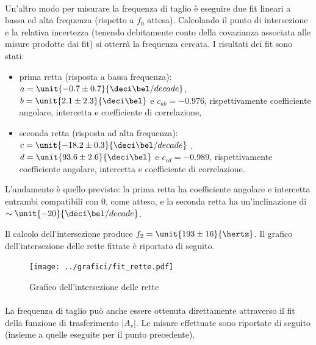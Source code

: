\documentclass[10pt,a4paper]{article}
\begin{document}
\paragraph{} Un'altro modo per misurare la frequenza di taglio è eseguire due fit lineari a bassa ed alta frequenza (rispetto a $f_0$ attesa). Calcolando il punto di intersezione e la relativa incertezza (tenendo debitamente conto della covazianza associata alle misure prodotte dai fit) si otterrà la frequenza cercata. I risultati dei fit sono stati: 
\begin{itemize}
	\item prima retta (risposta a bassa frequenza):	 $a=\unit{-0.7 \pm 0.7}{\deci\bel/decade}$,  $b=\unit{2.1 \pm 2.3}{\deci\bel}$ e $c_{ab} = -0.976$, rispettivamente coefficiente angolare, intercetta e coefficiente di correlazione,
	\item seconda retta (risposta ad alta frequenza):	 $c=\unit{-18.2 \pm 0.3}{\deci\bel/decade}$ , $d=\unit{93.6 \pm 2.6}{\deci\bel}$ e $c_{cd} = -0.989$, rispettivamente coefficiente angolare, intercetta e coefficiente di correlazione.
\end{itemize}
L'andamento è quello previsto: la prima retta ha coefficiente angolare e intercetta entrambi compatibili con $0$, come atteso, e la seconda retta ha un'inclinazione di $\sim \unit{-20}{\deci\bel / decade}$.

Il calcolo dell'intersezione produce $f_2 =\unit{ 193 \pm 16}{\hertz}$.
Il grafico dell'intersezione delle rette fittate è riportato di seguito.
\begin{figure}[h!]
	\centering
	\texttt{[image: ../grafici/fit\_rette.pdf]}
	\caption{Grafico dell'intersezione delle rette}
\end{figure}

\paragraph{} La frequenza di taglio può anche essere ottenuta direttamente attraverso il fit della funzione di trasferimento $|A_v|$. Le misure effettuate sono riportate di seguito (insieme a quelle eseguite per il punto precedente).
\end{document}
